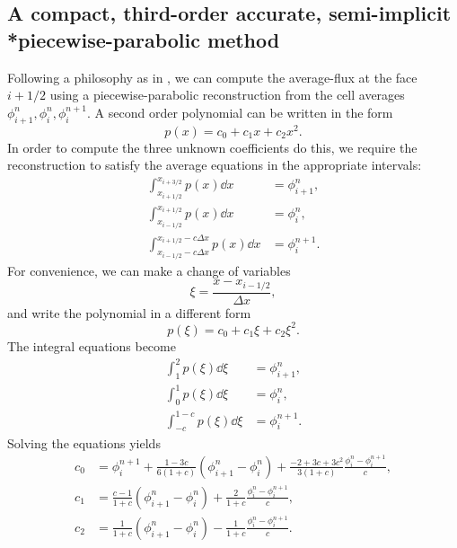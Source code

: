 \documentclass[../thesis.tex]{subfiles}
\begin{document}
\subsection[]{A compact, third-order accurate, semi-implicit \\*piecewise-parabolic method}
Following a philosophy as in \cite{1977_VanLeer},
we can compute the average-flux at the face \(i+1/2\) using a piecewise-parabolic reconstruction from the cell averages \(\phi_{i+1}^{n}, \phi_{i}^{n}, \phi_{i}^{n+1}\). A second order polynomial can be written in the form
\begin{equation}
    p(x) = c_0 + c_1 x + c_2 x^2.
\end{equation}
In order to compute the three unknown coefficients do this, we require the reconstruction to satisfy the average equations in the appropriate intervals:
\begin{equation}
    \begin{split}
        \int_{x_{i+1/2}}^{x_{i+3/2}} p(x) \dd{x}
        &= \phi_{i+1}^{n},
        \\
        \int_{x_{i-1/2}}^{x_{i+1/2}} p(x) \dd{x}
        &= \phi_{i}^{n},
        \\
        \int_{x_{i-1/2} - c\Delta x}^{x_{i+1/2} - c\Delta x} p(x) \dd{x}
        &= \phi_{i}^{n+1}.
    \end{split}
\end{equation}
For convenience, we can make a change of variables
\begin{equation}
    \xi = \frac{x-x_{i-1/2}}{\Delta x},
\end{equation}
and write the polynomial in a different form
\begin{equation}\label{eqn: parabola-xi}
    p(\xi) = c_0 + c_1\xi + c_2\xi^2.
\end{equation}
The integral equations become
\begin{equation}\label{eqn: parabola-integral-xi}
    \begin{split}
        \int_{1}^{2} p(\xi) \dd{\xi}
        &= \phi_{i+1}^{n},
        \\
        \int_{0}^{1} p(\xi) \dd{\xi}
        &= \phi_{i}^{n},
        \\
        \int_{-c}^{1-c} p(\xi) \dd{\xi}
        &= \phi_{i}^{n+1}.
    \end{split}
\end{equation}
Solving the equations yields
\begin{equation}
    \begin{split}
        c_0 &= \phi_{i}^{n+1}
        +\frac{1-3c}{6(1+c)}
        \left( \phi_{i+1}^{n}-\phi_{i}^{n} \right)
        +\frac{-2+3c+3c^2}{3(1+c)}
        \frac{\phi_{i}^{n}-\phi_{i}^{n+1}}{c},
        \\
        c_1 &=
        \frac{c-1}{1+c}
        \left( \phi_{i+1}^{n}-\phi_{i}^{n} \right)
        +\frac{2}{1+c}
        \frac{\phi_{i}^{n}-\phi_{i}^{n+1}}{c},
        \\
        c_2 &=
        \frac{1}{1+c}
        \left( \phi_{i+1}^{n}-\phi_{i}^{n} \right)
        -\frac{1}{1+c}
        \frac{\phi_{i}^{n}-\phi_{i}^{n+1}}{c}.
    \end{split}
\end{equation}
\end{document}
